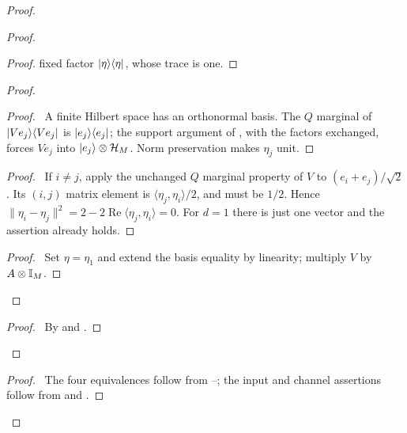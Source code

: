 \begin{proof}
\begin{proof}
\begin{proof}
  fixed factor $\lvert \eta\rangle\langle \eta\rvert$, whose trace is one.
  \end{proof}
  \begin{proof}
   \begin{proof}\pf\ A finite Hilbert space has an orthonormal basis.
   The $Q$ marginal of $\lvert Ve_j\rangle\langle Ve_j\rvert$ is $\lvert e_j\rangle\langle e_j\rvert$; the support
   argument of , with the factors exchanged,
   forces $Ve_j$ into $\lvert e_j\rangle\otimes\mathcal{H}_M$. Norm preservation
   makes $\eta_j$ unit.
   \end{proof}
   \begin{proof}\pf\ If $i\ne j$, apply the unchanged $Q$ marginal
   property of $V$ to $(e_i+e_j)/\sqrt2$. Its $(i,j)$ matrix element
   is $\langle\eta_j,\eta_i\rangle/2$, and must be $1/2$.
   Hence $\|\eta_i-\eta_j\|^2=2-2\operatorname{Re}
   \langle\eta_j,\eta_i\rangle=0$. For $d=1$ there is just one
   vector and the assertion already holds.
   \end{proof}
   \qedstep
   \begin{proof}\pf\ Set $\eta=\eta_1$ and extend the basis
   equality by linearity; multiply $V$ by $A\otimes\mathbb{I}_M$.
   \end{proof}
  \end{proof}
  \qedstep
  \begin{proof}\pf\ By  and
  .
  \end{proof}
 \end{proof}
 \qedstep
 \begin{proof}\pf\ The four equivalences follow from
 --; the
 input and channel assertions follow from 
 and .
 \end{proof}
\end{proof}

